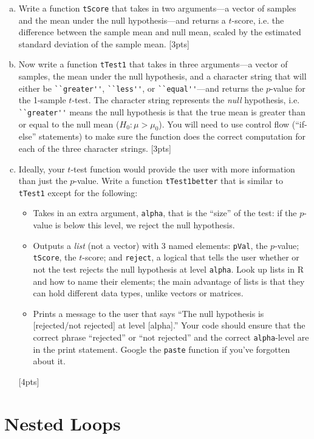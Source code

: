 \documentclass[12pt]{article}
\begin{document}
\begin{enumerate}[(a)]
	\item Write a function \verb|tScore| that takes in two arguments---a vector of samples and the mean under the null hypothesis---and returns a $t$-score, i.e. the difference between the sample mean and null mean, scaled by the estimated standard deviation of the sample mean. [3pts]
	\item Now write a function \verb|tTest1| that takes in three arguments---a vector of samples, the mean under the null hypothesis, and a character string that will either be \verb|``greater''|, \verb|``less''|, or \verb|``equal''|---and returns the $p$-value for the 1-sample $t$-test. The character string represents the \textit{null} hypothesis, i.e. \verb|``greater''| means the null hypothesis is that the true mean is greater than or equal to the null mean ($H_0: \mu > \mu_0$). You will need to use control flow (``if-else'' statements) to make sure the function does the correct computation for each of the three character strings. [3pts]
	\item Ideally, your $t$-test function would provide the user with more information than just the $p$-value. Write a function \verb|tTest1better| that is similar to \verb|tTest1| except for the following:
	\begin{itemize}
		\item Takes in an extra argument, \verb|alpha|, that is the ``size'' of the test: if the $p$-value is below this level, we reject the null hypothesis.
		\item Outputs a \textit{list} (not a vector) with 3 named elements: \verb|pVal|, the $p$-value; \verb|tScore|, the $t$-score; and \verb|reject|, a logical that tells the user whether or not the test rejects the null hypothesis at level \verb|alpha|. Look up lists in R and how to name their elements; the main advantage of lists is that they can hold different data types, unlike vectors or matrices.
		\item Prints a message to the user that says ``The null hypothesis is [rejected/not rejected] at level [alpha].'' Your code should ensure that the correct phrase ``rejected'' or ``not rejected'' and the correct \verb|alpha|-level are in the print statement. Google the \verb|paste| function if you've forgotten about it.
	\end{itemize}
	[4pts]
\end{enumerate}

\section{Nested Loops}
\end{document}
